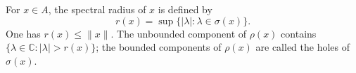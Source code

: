 For $x \in A$, the spectral radius of $x$ is defined by
$$r(x) = \sup \{|\lambda| : \lambda \in \sigma(x)\}.$$
One has $r(x) \leq \|x\|$. The unbounded component of $\rho(x)$ contains $\{\lambda \in \mathbb{C} : |\lambda| > r(x)\}$; the bounded components of $\rho(x)$ are called the holes of $\sigma(x)$.
